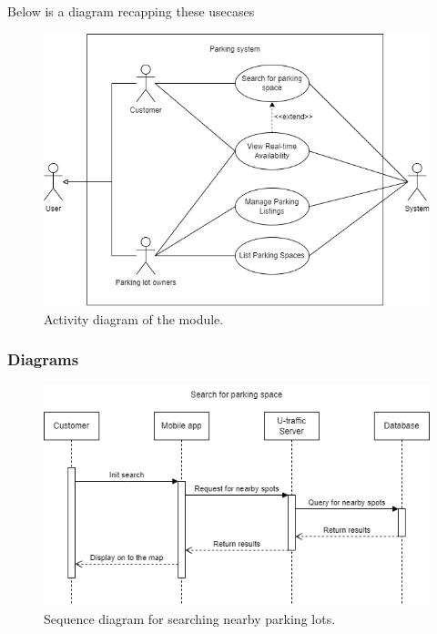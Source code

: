 Below is a diagram recapping these usecases

\begin{figure}[H]
    \centering
    \includegraphics[width=0.7\linewidth]{assets/images/Implementation/Parking/Parking Use case updated.drawio.png}
    \caption{Activity diagram of the module.}
    \label{fig:parking_usecase}
\end{figure}

\subsubsection{Diagrams}


\begin{figure}[H]
    \centering
    \includegraphics[width=\linewidth]{assets/images/Implementation/Parking/Search_lot_sequence.png}
    \caption{Sequence diagram for searching nearby parking lots.}
    \label{fig:parking_search}
\end{figure}

